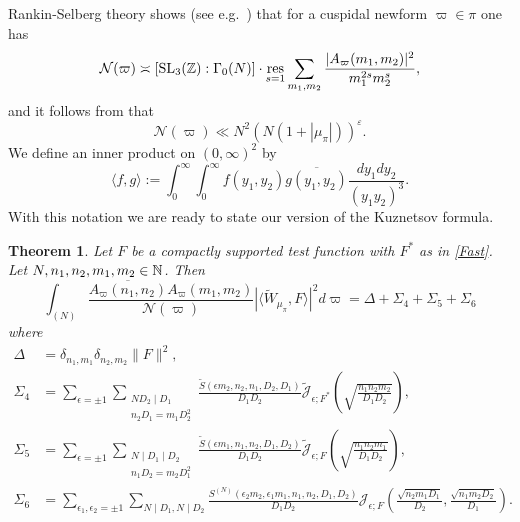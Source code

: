 \documentclass[11pt]{amsart}
\theoremstyle{plain}
\newtheorem{theorem}{Theorem}
\numberwithin{equation}{section}
\theoremstyle{definition}
\begin{document}
Rankin-Selberg theory shows   (see e.g.\ \cite[Lemma 1]{Bl}) that for a cuspidal newform $\varpi \in \pi$ one has 
\begin{displaymath}
\mathcal{N}(\varpi)   \asymp [{\rm SL}_3( \Bbb{Z}) : \Gamma_0(N)] \cdot \underset{s=1}{\text{res}} \sum_{m_1, m_2} \frac{|A_{\varpi}(m_1, m_2)|^2}{m_1^{2s} m_2^s},
\end{displaymath}
and  it  follows from  \cite[Theorem 2]{Li} that 
\begin{equation}\label{res}
  \mathcal{N}(\varpi) \ll N^2(N(1 + |\mu_{\pi}|))^{\varepsilon}. 
  \end{equation}
 We define an inner product on  $(0, \infty)^2$ by
\begin{displaymath}
  \langle f, g \rangle := \int_0^{\infty} \int_0^{\infty}  f(y_1, y_2) \overline{g(y_1, y_2)} \frac{dy_1 dy_2}{(y_1y_2)^3}. 
\end{displaymath}
With this notation we are ready to state our version of the Kuznetsov formula. 
\begin{theorem}\label{kuz} Let $F$ be a compactly supported test function with $F^{\ast}$ as in \eqref{Fast}. Let $N, n_1, n_2, m_1, m_2 \in \Bbb{N}$.  Then
\begin{equation}\label{kuzform}
\int_{(N)} \frac{\overline{A_{\varpi}(n_1, n_2)} A_{\varpi}(m_1, m_2)}{\mathcal{N}(\varpi)} |\langle \tilde{W}_{\mu_{\pi}}, F\rangle|^2  d\varpi= \Delta + \Sigma_4 + \Sigma_5 + \Sigma_6
\end{equation}
where
\begin{equation}\label{terms}
\begin{split}
  \Delta& = \delta_{n_1, m_1} \delta_{n_2, m_2}   \| F \|^2,\\
   \Sigma_{4}& = \sum_{\epsilon  = \pm 1} \sum_{\substack{N D_2 \mid D_1\\  n_2 D_1= m_1 D_2^2}}\frac{ \tilde{S}(\epsilon m_2, n_2, n_1, D_2, D_1)}{D_1D_2}  \tilde{\mathcal{J}}_{\epsilon; F^{\ast}}\left(\sqrt{\frac{n_1 n_2 m_2}{D_1D_2}} \right),\\
 \Sigma_{5} &= \sum_{\epsilon  = \pm 1} \sum_{\substack{ N \mid  D_1 \mid D_2\\ n_1 D_2 = m_2 D_1^2}} \frac{ \tilde{S}(\epsilon m_1, n_1, n_2, D_1, D_2) }{D_1D_2}\tilde{\mathcal{J}}_{\epsilon; F}\left( \sqrt{\frac{n_1 n_2 m_1}{D_1D_2}}  \right), \\
   \Sigma_6 &= \sum_{\epsilon_1, \epsilon_2 = \pm 1} \sum_{N \mid D_1, N \mid D_2  } \frac{S^{(N)}(\epsilon_2 m_2, \epsilon_1 m_1, n_1, n_2, D_1, D_2)}{D_1D_2}\mathcal{J}_{\epsilon;F}\left( \frac{\sqrt{n_2 m_1 D_1}}{D_2 }, \frac{\sqrt{n_1 m_2 D_2}}{D_1}\right).
\end{split}
\end{equation} 
\end{theorem}
\end{document}
